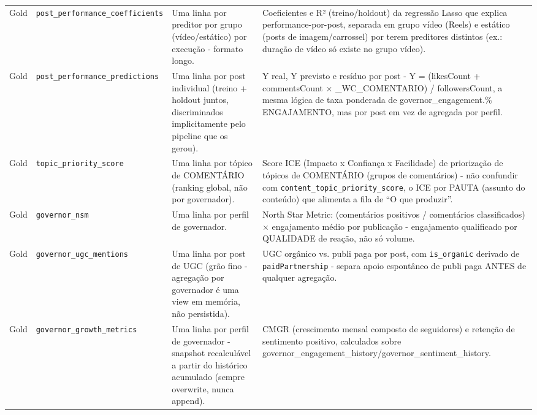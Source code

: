 \begin{footnotesize}
\begin{longtable}{p{1.2cm}p{3.4cm}p{3.6cm}p{6.0cm}}
Gold & \texttt{post\_\allowbreak{}performance\_\allowbreak{}coefficients} & Uma linha por preditor por grupo (vídeo/\allowbreak{}estático) por execução - formato longo. & Coeficientes e R² (treino/\allowbreak{}holdout) da regressão Lasso que explica performance-por-post, separada em grupo vídeo (Reels) e estático (posts de imagem/\allowbreak{}carrossel) por terem preditores distintos (ex.: duração de vídeo só existe no grupo vídeo). \\
Gold & \texttt{post\_\allowbreak{}performance\_\allowbreak{}predictions} & Uma linha por post individual (treino + holdout juntos, discriminados implicitamente pelo pipeline que os gerou). & Y real, Y previsto e resíduo por post - Y = (likesCount + commentsCount × \_\allowbreak{}WC\_\allowbreak{}COMENTARIO) /\allowbreak{} followersCount, a mesma lógica de taxa ponderada de governor\_\allowbreak{}engagement.\% ENGAJAMENTO, mas por post em vez de agregada por perfil. \\
Gold & \texttt{topic\_\allowbreak{}priority\_\allowbreak{}score} & Uma linha por tópico de COMENTÁRIO (ranking global, não por governador). & Score ICE (Impacto x Confiança x Facilidade) de priorização de tópicos de COMENTÁRIO (grupos de comentários) - não confundir com \texttt{content\_\allowbreak{}topic\_\allowbreak{}priority\_\allowbreak{}score}, o ICE por PAUTA (assunto do conteúdo) que alimenta a fila de ``O que produzir''. \\
Gold & \texttt{governor\_\allowbreak{}nsm} & Uma linha por perfil de governador. & North Star Metric: (comentários positivos /\allowbreak{} comentários classificados) × engajamento médio por publicação - engajamento qualificado por QUALIDADE de reação, não só volume. \\
Gold & \texttt{governor\_\allowbreak{}ugc\_\allowbreak{}mentions} & Uma linha por post de UGC (grão fino - agregação por governador é uma view em memória, não persistida). & UGC orgânico vs. publi paga por post, com \texttt{is\_\allowbreak{}organic} derivado de \texttt{paidPartnership} - separa apoio espontâneo de publi paga ANTES de qualquer agregação. \\
Gold & \texttt{governor\_\allowbreak{}growth\_\allowbreak{}metrics} & Uma linha por perfil de governador - snapshot recalculável a partir do histórico acumulado (sempre overwrite, nunca append). & CMGR (crescimento mensal composto de seguidores) e retenção de sentimento positivo, calculados sobre governor\_\allowbreak{}engagement\_\allowbreak{}history/\allowbreak{}governor\_\allowbreak{}sentiment\_\allowbreak{}history. \\

\end{longtable}
\end{footnotesize}
